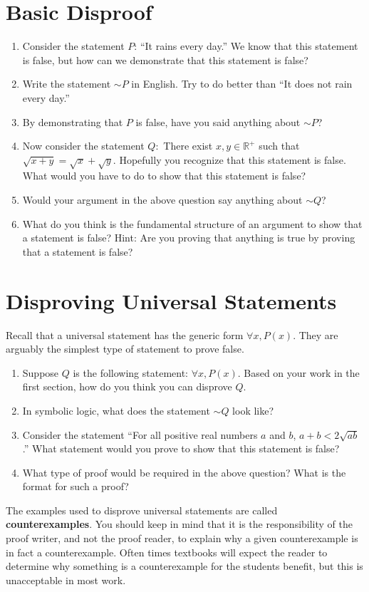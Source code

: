 \documentclass[12 pt]{article}
\newcommand{\R}{\mathbb{R}}
\theoremstyle{definition}
\theoremstyle{plain}
\theoremstyle{mytheorem}
\theoremstyle{myexample}
\theoremstyle{mydefinition}
\begin{document}
\section{Basic Disproof}
\begin{enumerate} \itemsep=.9in
\item Consider the statement $P$: ``It rains every day.''  We know that this statement is false, but how can we demonstrate that this statement is false?  
\item Write the statement $\sim P$ in English.  Try to do better than ``It does not rain every day.''
\item By demonstrating that $P$ is false, have you said anything about $\sim P$?
\item Now consider the statement $Q:$ There exist $x,y \in \R^+$ such that $\sqrt{x+y} = \sqrt{x} + \sqrt{y}$.  Hopefully you recognize that this statement is false.  What would you have to do to show that this statement is false?
\item Would your argument in the above question say anything about $\sim Q$?
\item What do you think is the fundamental structure of an argument to show that a statement is false?  Hint: Are you proving that anything is true by proving that a statement is false?

\vspace{.9in}
\end{enumerate}

\section{Disproving Universal Statements}
Recall that a universal statement has the generic form $\forall x, P(x)$.  They are arguably the simplest type of statement to prove false.
\begin{enumerate}[resume] \itemsep=.9in
\item Suppose $Q$ is the following statement: $\forall x, P(x)$.  Based on your work in the first section, how do you think you can disprove $Q$.
\item In symbolic logic, what does the statement $\sim Q$ look like?
\item Consider the statement ``For all positive real numbers $a$ and $b$, $a+b < 2 \sqrt{ab}$.''  What statement would you prove to show that this statement is false?
\item What type of proof would be required in the above question?  What is the format for such a proof?
\vspace{.9in}
\end{enumerate}
The examples used to disprove universal statements are called \textbf{counterexamples}.  You should keep in mind that it is the responsibility of the proof writer, and not the proof reader, to explain why a given counterexample is in fact a counterexample.  Often times textbooks will expect the reader to determine why something is a counterexample for the students benefit, but this is unacceptable in most work.
\end{document}

